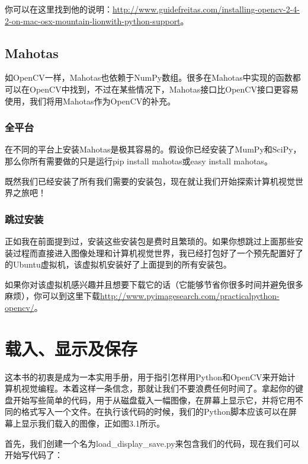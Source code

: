 \documentclass[color=cyan,mathpazo,titlestyle=hang]{elegantbook}
\begin{document}
你可以在这里找到他的说明：\href{http://www.guidefreitas.com/installing-opencv-2-4-2-on-mac-osx-mountain-lionwith-python-support}{http://www.guidefreitas.com/installing-opencv-2-4-2-on-mac-osx-mountain-lionwith-python-support}。

\section{Mahotas}

如OpenCV一样，Mahotas也依赖于NumPy数组。很多在Mahotas中实现的函数都可以在OpenCV中找到，不过在某些情况下，Mahotas接口比OpenCV接口更容易使用，我们将用Mahotas作为OpenCV的补充。

\subsection{全平台}

在不同的平台上安装Mahotas是极其容易的。假设你已经安装了MumPy和SciPy，那么你所有需要做的只是运行pip install mahotas或easy install mahotas。

既然我们已经安装了所有我们需要的安装包，现在就让我们开始探索计算机视觉世界之旅吧！

\subsection{跳过安装}

正如我在前面提到过，安装这些安装包是费时且繁琐的。如果你想跳过上面那些安装过程而直接进入图像处理和计算机视觉世界，我已经打包好了一个预先配置好了的Ubuntu虚拟机，该虚拟机安装好了上面提到的所有安装包。

如果你对该虚拟机感兴趣并且想要下载它的话（它能够节省你很多时间并避免很多麻烦），你可以到这里下载\href{http://www.pyimagesearch.com/practicalpython-opencv/}{http://www.pyimagesearch.com/practicalpython-opencv/}。

\chapter{载入、显示及保存}

这本书的初衷是成为一本实用手册，用于指引怎样用Python和OpenCV来开始计算机视觉编程。本着这样一条信念，那就让我们不要浪费任何时间了。拿起你的键盘开始写些简单的代码，用于从磁盘载入一幅图像，在屏幕上显示它，并将它用不同的格式写入一个文件。在执行该代码的时候，我们的Python脚本应该可以在屏幕上显示我们载入的图像，正如图3.1所示。

首先，我们创建一个名为load\_display\_save.py来包含我们的代码，现在我们可以开始写代码了：
\end{document}
